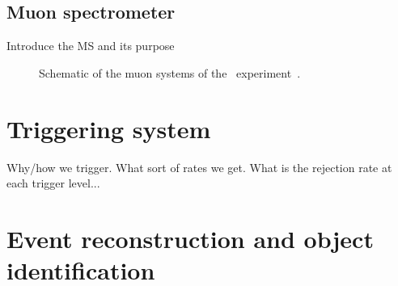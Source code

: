 \subsection{Muon spectrometer} 

{\color{red} Introduce the MS and its purpose}

\begin{figure}[ht]
  \caption{
    Schematic of the muon systems of the
    \atlas\ experiment~\cite{Pequenao:1095929}.
  }
  \label{fig:ms_cartoon}
\end{figure}


\FloatBarrier
\section{Triggering system}

{\color{red} Why/how we trigger. What sort of rates we get. What is the
rejection rate at each trigger level...}

\FloatBarrier
\section{Event reconstruction and object identification}
\label{sec:event_reco}

